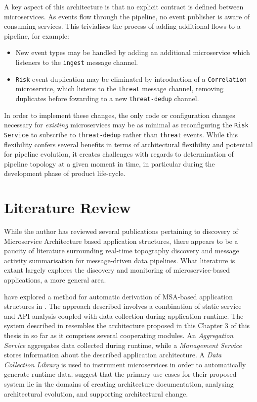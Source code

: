 A key aspect of this architecture is that no explicit contract is defined between microservices. As events flow through the pipeline, no event publisher is aware of consuming services. This trivialises the process of adding additional flows to a pipeline, for example:

\begin{itemize}
	\item New event types may be handled by adding an additional microservice which listeners to the \texttt{ingest} message channel.
	\item \texttt{Risk} event duplication may be eliminated by introduction of a \texttt{Correlation} microservice, which listens to the \texttt{threat} message channel, removing duplicates before fowarding to a new \texttt{threat-dedup} channel.
\end{itemize}

In order to implement these changes, the only code or configuration changes necessary for \textit{existing} microservices may be as minimal as reconfiguring the \texttt{Risk Service} to subscribe to \texttt{threat-dedup} rather than \texttt{threat} events. While this flexibility confers several benefits in terms of architectural flexibility and potential for pipeline evolution, it creates challenges with regards to determination of pipeline topology at a given moment in time, in particular during the development phase of product life-cycle.


\section{Literature Review}

While the author has reviewed several publications pertaining to discovery of Microservice Architecture based application structures, there appears to be a paucity of literature surrounding real-time topography discovery and message activity summarisation for message-driven data pipelines. What literature is extant largely explores the discovery and monitoring of microservice-based applications, a more general area.

 \citeauthor{8359145} have explored a method for automatic derivation of MSA-based application structures in \cite{8359145}. The approach described involves a combination of static service and API analysis coupled with data collection during application runtime. The system described in \cite{8359145} resembles the architecture proposed in this Chapter 3 of this thesis in so far as it comprises several cooperating modules. An \textit{Aggregation Service} aggregates data collected during runtime, while a \textit{Management Service} stores information about the described application architecture. A \textit{Data Collection Library} is used to instrument microservices in order to automatically generate runtime data. \citeauthor{8359145} suggest that the primary use cases for their proposed system lie in the domains of creating architecture documentation, analysing architectural evolution, and supporting architectural change.


